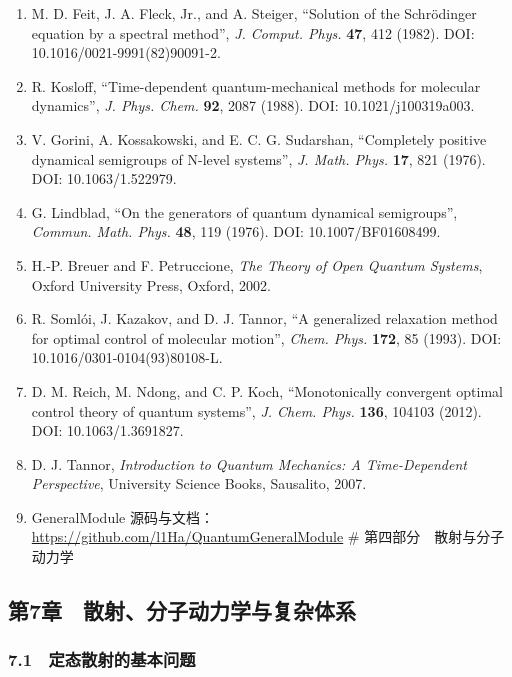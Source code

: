 \documentclass[
]{ctexbook}
\providecommand{\tightlist}{%
  \setlength{\itemsep}{0pt}\setlength{\parskip}{0pt}}
\let\origsubsection\subsection
\renewcommand{\subsection}[1]{%
  \needspace{6\baselineskip}%
  \origsubsection{#1}%
}
\begin{document}
\begin{enumerate}
\def\labelenumi{\arabic{enumi}.}
\tightlist
\item
  M. D. Feit, J. A. Fleck, Jr., and A. Steiger, ``Solution of the
  Schrödinger equation by a spectral method'', \emph{J. Comput. Phys.}
  \textbf{47}, 412 (1982). DOI: 10.1016/0021-9991(82)90091-2.
\item
  R. Kosloff, ``Time-dependent quantum-mechanical methods for molecular
  dynamics'', \emph{J. Phys. Chem.} \textbf{92}, 2087 (1988). DOI:
  10.1021/j100319a003.
\item
  V. Gorini, A. Kossakowski, and E. C. G. Sudarshan, ``Completely
  positive dynamical semigroups of N-level systems'', \emph{J. Math.
  Phys.} \textbf{17}, 821 (1976). DOI: 10.1063/1.522979.
\item
  G. Lindblad, ``On the generators of quantum dynamical semigroups'',
  \emph{Commun. Math. Phys.} \textbf{48}, 119 (1976). DOI:
  10.1007/BF01608499.
\item
  H.-P. Breuer and F. Petruccione, \emph{The Theory of Open Quantum
  Systems}, Oxford University Press, Oxford, 2002.
\item
  R. Somlói, J. Kazakov, and D. J. Tannor, ``A generalized relaxation
  method for optimal control of molecular motion'', \emph{Chem. Phys.}
  \textbf{172}, 85 (1993). DOI: 10.1016/0301-0104(93)80108-L.
\item
  D. M. Reich, M. Ndong, and C. P. Koch, ``Monotonically convergent
  optimal control theory of quantum systems'', \emph{J. Chem. Phys.}
  \textbf{136}, 104103 (2012). DOI: 10.1063/1.3691827.
\item
  D. J. Tannor, \emph{Introduction to Quantum Mechanics: A
  Time-Dependent Perspective}, University Science Books, Sausalito,
  2007.
\item
  GeneralModule
  源码与文档：\url{https://github.com/l1Ha/QuantumGeneralModule} \#
  第四部分　散射与分子动力学
\end{enumerate}

\hypertarget{ux7b2c7ux7ae0-ux6563ux5c04ux5206ux5b50ux52a8ux529bux5b66ux4e0eux590dux6742ux4f53ux7cfb}{%
\subsection{第7章　散射、分子动力学与复杂体系}\label{ux7b2c7ux7ae0-ux6563ux5c04ux5206ux5b50ux52a8ux529bux5b66ux4e0eux590dux6742ux4f53ux7cfb}}

\hypertarget{ux5b9aux6001ux6563ux5c04ux7684ux57faux672cux95eeux9898}{%
\subsubsection{7.1　定态散射的基本问题}\label{ux5b9aux6001ux6563ux5c04ux7684ux57faux672cux95eeux9898}}
\end{document}
